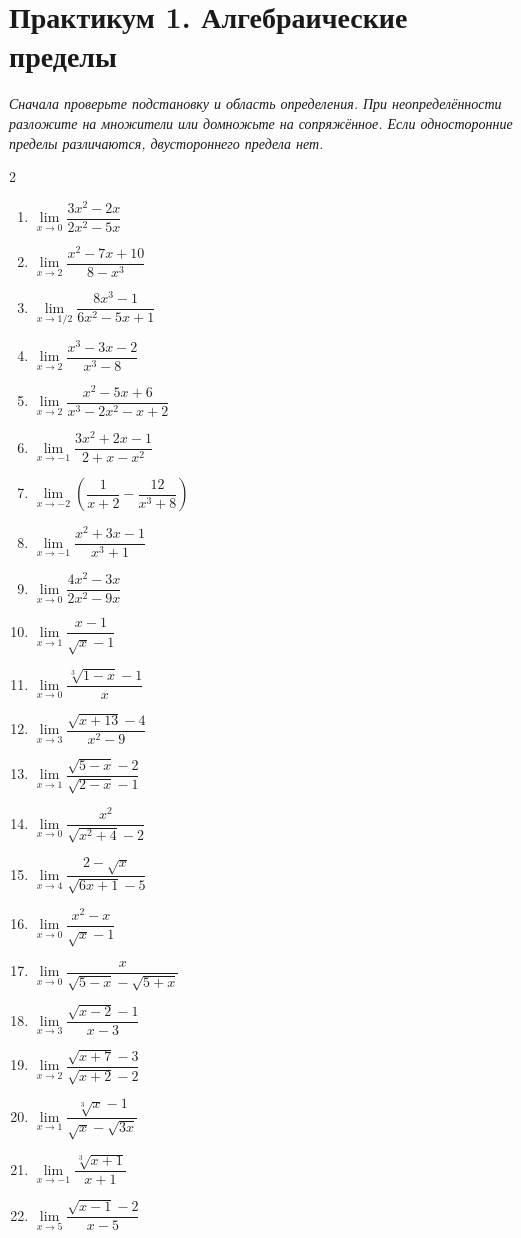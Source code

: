 \clearpage
\section*{Практикум 1. Алгебраические пределы}
\textit{Сначала проверьте подстановку и область определения. При неопределённости разложите на множители или домножьте на сопряжённое. Если односторонние пределы различаются, двустороннего предела нет.}
\begin{multicols}{2}
\begin{enumerate}
\item$\lim\limits_{x\to0}\dfrac{3x^2-2x}{2x^2-5x}$
\item$\lim\limits_{x\to2}\dfrac{x^2-7x+10}{8-x^3}$
\item$\lim\limits_{x\to1/2}\dfrac{8x^3-1}{6x^2-5x+1}$
\item$\lim\limits_{x\to2}\dfrac{x^3-3x-2}{x^3-8}$
\item$\lim\limits_{x\to2}\dfrac{x^2-5x+6}{x^3-2x^2-x+2}$
\item$\lim\limits_{x\to-1}\dfrac{3x^2+2x-1}{2+x-x^2}$
\item$\lim\limits_{x\to-2}\left(\dfrac1{x+2}-\dfrac{12}{x^3+8}\right)$
\item$\lim\limits_{x\to-1}\dfrac{x^2+3x-1}{x^3+1}$
\item$\lim\limits_{x\to0}\dfrac{4x^2-3x}{2x^2-9x}$
\item$\lim\limits_{x\to1}\dfrac{x-1}{\sqrt{x}-1}$
\item$\lim\limits_{x\to0}\dfrac{\sqrt[3]{1-x}-1}{x}$
\item$\lim\limits_{x\to3}\dfrac{\sqrt{x+13}-4}{x^2-9}$
\item$\lim\limits_{x\to1}\dfrac{\sqrt{5-x}-2}{\sqrt{2-x}-1}$
\item$\lim\limits_{x\to0}\dfrac{x^2}{\sqrt{x^2+4}-2}$
\item$\lim\limits_{x\to4}\dfrac{2-\sqrt{x}}{\sqrt{6x+1}-5}$
\item$\lim\limits_{x\to0}\dfrac{x^2-x}{\sqrt{x}-1}$
\item$\lim\limits_{x\to0}\dfrac{x}{\sqrt{5-x}-\sqrt{5+x}}$
\item$\lim\limits_{x\to3}\dfrac{\sqrt{x-2}-1}{x-3}$
\item$\lim\limits_{x\to2}\dfrac{\sqrt{x+7}-3}{\sqrt{x+2}-2}$
\item$\lim\limits_{x\to1}\dfrac{\sqrt[3]{x}-1}{\sqrt{x}-\sqrt{3x}}$
\item$\lim\limits_{x\to-1}\dfrac{\sqrt[3]{x+1}}{x+1}$
\item$\lim\limits_{x\to5}\dfrac{\sqrt{x-1}-2}{x-5}$
\end{enumerate}
\end{multicols}

